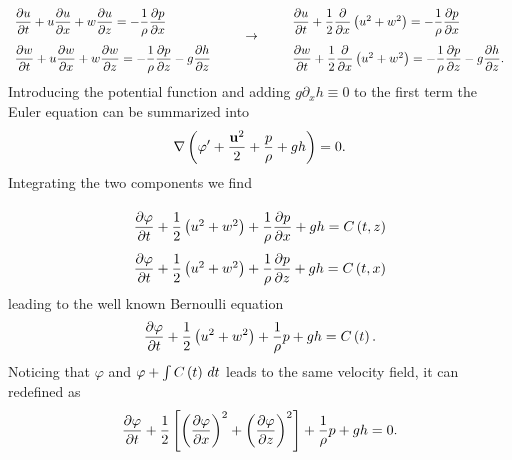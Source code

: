 \begin{equation*}
\begin{array}{l}
\vphantom{\int^{\dfrac{1}{2}}}\dfrac{\partial u}{\partial t} + u \dfrac{\partial u}{\partial x} + w \dfrac{\partial u}{\partial z}=-\dfrac{1}{\rho}\dfrac{\partial p}{\partial x} \\
\vphantom{\int^{\dfrac{1}{2}}}\dfrac{\partial w}{\partial t} + u \dfrac{\partial w}{\partial x} + w \dfrac{\partial w}{\partial z}=-\dfrac{1}{\rho}\dfrac{\partial p}{\partial z}-g\dfrac{\partial h}{\partial z}
\end{array} \qquad\rightarrow\qquad 
\begin{array}{l}
\vphantom{\int^{\dfrac{1}{2}}}\dfrac{\partial u}{\partial t} + \dfrac{1}{2}\dfrac{\partial}{\partial x}\rbkt{u^{2}+w^{2}}=-\dfrac{1}{\rho}\dfrac{\partial p}{\partial x} \\
\vphantom{\int^{\dfrac{1}{2}}}\dfrac{\partial w}{\partial t} + \dfrac{1}{2}\dfrac{\partial}{\partial x}\rbkt{u^{2}+w^{2}}=-\dfrac{1}{\rho}\dfrac{\partial p}{\partial z}-g\dfrac{\partial h}{\partial z}.
\end{array}
\end{equation*}
Introducing the potential function and adding $g\partial_{x}h\equiv 0$ to the first term the Euler equation can be summarized into
\begin{equation}
\nabla\left( \varphi'+\dfrac{\mathbf{u}^{2}}{2}+\dfrac{p}{\rho}+gh \right)=0.
\end{equation}
Integrating the two components we find
\begin{equation*}
\begin{array}{l}
\vphantom{\int^{\dfrac{1}{2}}}\dfrac{\partial \varphi}{\partial t} + \dfrac{1}{2}\rbkt{u^{2}+w^{2}}+\dfrac{1}{\rho}\dfrac{\partial p}{\partial x}+gh=C\rbkt{t,z} \\
\vphantom{\int^{\dfrac{1}{2}}}\dfrac{\partial \varphi}{\partial t} + \dfrac{1}{2}\rbkt{u^{2}+w^{2}}+\dfrac{1}{\rho}\dfrac{\partial p}{\partial z}+gh=C\rbkt{t,x}
\end{array}
\end{equation*}
leading to the well known Bernoulli equation
\begin{equation}
\dfrac{\partial \varphi}{\partial t} + \dfrac{1}{2}\left( u^{2}+w^{2} \right)+\dfrac{1}{\rho}p+gh=C\left( t \right).
\end{equation}
Noticing that $\varphi$ and $\varphi+\int C\left( t \right)\,dt$ leads to the same velocity field, it can redefined as
\begin{equation}
\dfrac{\partial \varphi}{\partial t} + \dfrac{1}{2}\left[ \left( \dfrac{\partial\varphi}{\partial x} \right)^{2}+\left( \dfrac{\partial\varphi}{\partial z} \right)^{2} \right]+\dfrac{1}{\rho}p+gh=0.
\end{equation}
